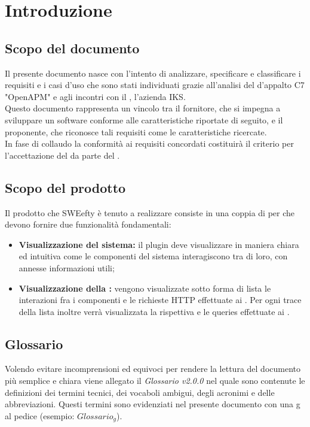 \section{Introduzione} \label{intro}
	\subsection{Scopo del documento}
	Il presente documento nasce con l'intento di analizzare, specificare e classificare i requisiti e i casi d'uso che sono stati individuati grazie all'analisi del  d'appalto C7 "OpenAPM" e agli incontri con il , l'azienda IKS.\\
	Questo documento rappresenta un vincolo tra il fornitore, che si impegna a sviluppare un software conforme alle caratteristiche riportate di seguito, e il proponente, che riconosce tali requisiti come le caratteristiche ricercate.\\
	In fase di collaudo la conformità ai requisiti concordati costituirà il criterio per l'accettazione del  da parte del .

	\subsection{Scopo del prodotto}
	Il prodotto che SWEefty è tenuto a realizzare consiste in una coppia di  per  che devono fornire due funzionalità fondamentali:
	\begin{itemize}
		\item \textbf{Visualizzazione  del sistema:} il plugin deve visualizzare in maniera chiara ed intuitiva come le componenti del sistema interagiscono tra di loro, con annesse informazioni utili;
		\item \textbf{Visualizzazione della :} vengono visualizzate sotto forma di lista le interazioni fra i componenti e le richieste HTTP effettuate ai . Per ogni trace della lista inoltre verrà visualizzata la rispettiva  e le queries effettuate ai .
	\end{itemize}

	\subsection{Glossario}
		Volendo evitare incomprensioni  ed equivoci per rendere la lettura del documento più semplice e chiara viene allegato il \emph{Glossario v2.0.0} nel quale sono contenute le definizioni dei termini tecnici, dei vocaboli ambigui, degli acronimi e delle abbreviazioni. Questi termini sono evidenziati nel presente documento con una g al pedice (esempio: $Glossario_{g}$).
